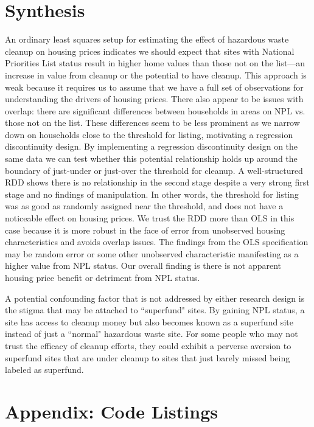 \documentclass[letterpaper, 12pt]{article}
\begin{document}


\section{Synthesis}

An ordinary least squares setup for estimating the effect of hazardous waste cleanup on housing prices indicates we should expect that sites with National Priorities List status result in higher home values than those not on the list---an increase in value from cleanup or the potential to have cleanup.  This approach is weak because it requires us to assume that we have a full set of observations for understanding the drivers of housing prices.  There also appear to be issues with overlap: there are significant differences between households in areas on NPL vs. those not on the list.  These differences seem to be less prominent as we narrow down on households close to the threshold for listing, motivating a regression discontinuity design.  By implementing a regression discontinuity design on the same data we can test whether this potential relationship holds up around the boundary of just-under or just-over the threshold for cleanup.    A well-structured RDD shows there is no relationship in the second stage despite a very strong first stage and no findings of manipulation.  In other words, the threshold for listing was as good as randomly assigned near the threshold, and does not have a noticeable effect on housing prices.  We trust the RDD more than OLS in this case because it is more robust in the face of error from unobserved housing characteristics and avoids overlap issues.  The findings from the OLS specification may be random error or some other unobserved characteristic manifesting as a higher value from NPL status.  Our overall finding is there is not apparent housing price benefit or detriment from NPL status.  

A potential confounding factor that is not addressed by either research design is the stigma that may be attached to ``superfund" sites.  By gaining NPL status, a site has access to cleanup money but also becomes known as a superfund site instead of just a ``normal" hazardous waste site.  For some people who may not trust the efficacy of cleanup efforts, they could exhibit a perverse aversion to superfund sites that are under cleanup to sites that just barely missed being labeled as superfund.

\section{Appendix: Code Listings}



\end{document}
